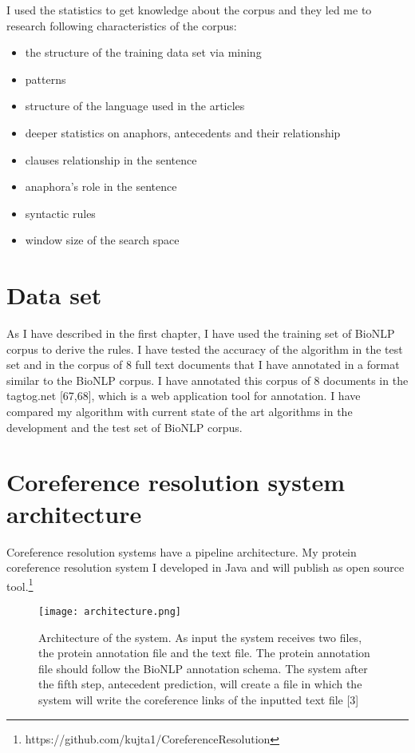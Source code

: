 I used the statistics to get knowledge about the corpus and they led me to research following characteristics of the corpus:

\begin{itemize}
	\item the structure of the training data set via mining
	\item patterns 
	\item structure of the language used in the articles
	\item deeper statistics on anaphors, antecedents and their relationship
	\item clauses relationship in the sentence
	\item anaphora's role in the sentence
	\item syntactic rules
	\item window size of the search space
\end{itemize}

\section{Data set}

As I have described in the first chapter, I have used the training set of BioNLP corpus to derive the rules. I have tested the accuracy of the algorithm in the test set and in the corpus of 8 full text documents that I have annotated in a format similar to the BioNLP corpus. I have annotated this corpus of 8 documents in the tagtog.net [67,68], which is a web application tool for annotation. I have compared my algorithm with current state of the art algorithms in the development and the test set of BioNLP corpus.

\section{Coreference resolution system architecture}

Coreference resolution systems have a pipeline architecture. My protein coreference resolution system I developed in Java and will publish as open source tool.\footnote{https://github.com/kujta1/CoreferenceResolution}
\newpage
\begin{figure}[t]
	\begin{center}
		\texttt{[image: architecture.png]} 
 		\caption{ Architecture of the system. As input the system receives two files, the protein annotation file and the text file. The protein annotation file should follow the BioNLP annotation schema. The system after the fifth step, antecedent prediction, will create a file  in which the system will write the coreference links of the inputted text file  [3] }
		\label{Figure 8}
	\end{center}
\end{figure}


